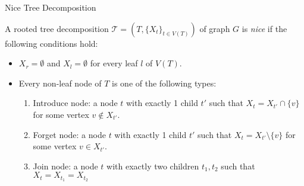 \documentclass[11pt,t, usenames, dvipsnames]{beamer}
\newcommand{\T}{\mathcal{T}}
\begin{document}
\begin{frame}{Nice Tree Decomposition} 
    \begin{definition}
        A rooted tree decomposition $\T=(T, \{X_t\}_{t \in V(T)})$ of graph $G$ is \textit{nice} if the following conditions hold:
        \begin{itemize}
            \item $X_r = \emptyset$ and $X_l = \emptyset$ for every leaf $l$ of $V(T)$.
            \item Every non-leaf node of $T$ is one of the following types:
            \begin{enumerate}
                \item Introduce node: a node $t$ with exactly 1 child $t'$ such that $X_t = X_{t'} \cap \{v\}$ for some vertex $v \not\in X_{t'}$.
                \item Forget node: a node $t$ with exactly 1 child $t'$ such that $X_t = X_{t'} \setminus \{v\}$ for some vertex $v \in X_{t'}$.
                \item Join node: a node $t$ with exactly two children $t_1, t_2$ such that $X_t = X_{t_1} = X_{t_2}$
            \end{enumerate}
        \end{itemize}
    \end{definition}
\end{frame}
\end{document}
